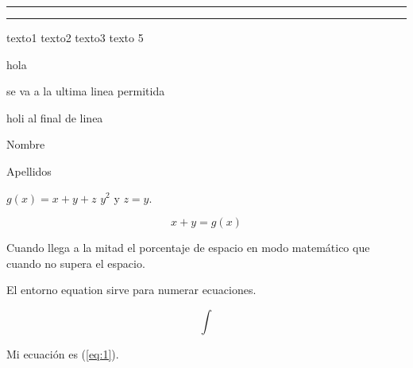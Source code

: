\documentclass{article}
\begin{document}
\rule{2cm}{3cm}

\rule{2cm}{4cm}


\setlength{\fboxrule}{0.5mm}


\setlength{\fboxsep}{1cm}


\setlength{\fboxrule}{0.6pt}%
\setlength{\fboxsep}{2pt}%


\begin{minipage}{5cm}
\lipsum[1]
\end{minipage}
\newpage

texto1 texto2 texto3  texto 5 

\newpage

hola
\vfill

se va a la ultima linea permitida

\newpage

holi
\hfill
al final de linea

Nombre \hrulefill

Apellidos \dotfill

\clearpage

\lipsum[1] $g(x)=x+y+z$ \lipsum[2] $y^{2}$ y $z=y$.


$$
x+y=g(x)
$$

Cuando llega a la mitad el porcentaje de espacio en modo matemático que cuando no supera el espacio.

El entorno equation sirve para numerar ecuaciones.

\begin{equation}\label{eq:1}
\int
\end{equation}

Mi ecuación es (\ref{eq:1}).%
\end{document}
